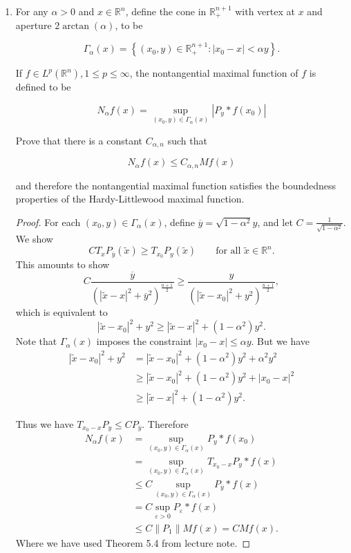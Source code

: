 \begin{enumerate}
\begin{proof}
	\[
		\int _E (Mf)^p d \mu
		\le  \left( 1 + \frac{3^n p}{1 - p} \right) |E|^{1 - p} \|f\|_1^p
	.\] 
\end{proof}

\item 
	For any $\alpha>0$ and $x \in \mathbb{R}^n$, define the cone in $\mathbb{R}_{+}^{n+1}$ with vertex at $x$ and aperture $2 \arctan (\alpha)$, to be

\[
\Gamma_\alpha(x)=\left\{\left(x_0, y\right) \in \mathbb{R}_{+}^{n+1}:\left|x_0-x\right|<\alpha y\right\} .
\]


If $f \in L^p\left(\mathbb{R}^n\right), 1 \leq p \leq \infty$, the nontangential maximal function of $f$ is defined to be

\[
N_\alpha f(x)=\sup _{\left(x_0, y\right) \in \Gamma_\alpha(x)}\left|P_y * f\left(x_0\right)\right|
\]


Prove that there is a constant $C_{\alpha, n}$ such that

\[
N_\alpha f(x) \leq C_{\alpha, n} M f(x)
\]

and therefore the nontangential maximal function satisfies the boundedness properties of the Hardy-Littlewood maximal function.

\begin{proof}
	For each $(x_0, y) \in \Gamma_\alpha(x)$, define $\overline{y}  = \sqrt{1 - \alpha^2} y$, and let $C = \frac{1}{\sqrt{1 - \alpha^2} }$. We show 
	\[
		C T_x P_{\overline{y} } (\tilde x) \ge T_{x_0} P_y (\tilde x) \qquad \text{for all } \tilde x \in \mathbb{R}^{n}
	.\] 
	This amounts to show
	\[
		C \frac{\overline{y} }{\left( |\tilde x - x|^2 + \overline{y} ^2 \right) ^{\frac{n + 1}{2}}} 
		\ge \frac{y }{\left( |\tilde x - x_0|^2 + y ^2 \right) ^{\frac{n + 1}{2}}}
	,\] 
	which is equivalent to
	\[
		\left| \tilde x - x_0 \right| ^2 + y^2 \ge  \left| \tilde x - x \right| ^2 + (1 - \alpha^2) y^2
	.\] 
	Note that $\Gamma_\alpha(x)$ imposes the constraint $|x_0 - x| \le \alpha y$.
	But we have
	\begin{align*}
		|\tilde x - x_0|^2 + y^2
		&= |\tilde x - x_0|^2 + (1 - \alpha^2)y^2 + \alpha^2y^2\\
		&\geq |\tilde x - x_0|^2 + (1 - \alpha^2)y^2 + |x_0 - x|^2\\
		&\geq |\tilde x - x|^2 + (1 - \alpha^2)y^2 
	.\end{align*}

	Thus we have $T_{x _0 - x} P_y \le C P_{\overline{y} }$. Therefore
	\begin{align*}
		N_\alpha f(x)
		&= \sup _{(x_0, y) \in \Gamma_\alpha(x)}P_y * f(x_0) \\
		&= \sup _{(x_0, y) \in \Gamma_\alpha(x)} T_{x_0 - x} P_y * f(x) \\
		&\leq C \sup _{(x_0, y) \in \Gamma_\alpha(x)}  P_{\overline{y} } * f(x) \\
		&= C \sup _{\varepsilon>0}  P_{\varepsilon} * f(x) \\
		&\leq C \|P_1\| M f(x) = C M f(x)
	.\end{align*}
	Where we have used Theorem 5.4 from lecture note.


\end{proof}
\end{enumerate}
